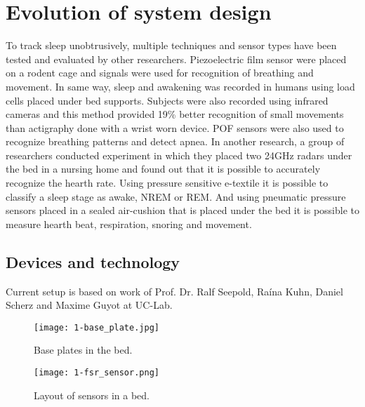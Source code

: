 \chapter{Evolution of system design}
\label{chap:evolution}

To track sleep unobtrusively, multiple techniques and sensor types have been tested and evaluated by other researchers. Piezoelectric film sensor were placed on a rodent cage and signals were used for recognition of breathing and movement\cite{piezo}. In same way, sleep and awakening was recorded in humans using load cells placed under bed supports\cite{load_cells}. Subjects were also recorded using infrared cameras and this method provided 19\% better recognition of small movements than actigraphy done with a wrist worn device\cite{video}. \ac{POF} sensors were also used to recognize breathing patterns and detect apnea\cite{optical}. In another research, a group of researchers conducted experiment in which they placed two 24\ac{GHz} radars under the bed in a nursing home and found out that it is possible to accurately recognize the hearth rate\cite{radar}. Using pressure sensitive e-textile it is possible to classify a sleep stage as awake, \ac{NREM} or \ac{REM}\cite{e-textile}. And using pneumatic pressure sensors placed in a sealed air-cushion that is placed under the bed it is possible to measure hearth beat, respiration, snoring and movement\cite{pneumatic}.

\section{Devices and technology}

Current setup is based on work of Prof. Dr. Ralf Seepold, Ra\'ina Kuhn, Daniel Scherz and Maxime Guyot at \ac{UC-Lab}\cite{Kuhn}\cite{Guyot}. 

\begin{figure}[h]
  \begin{center}
    \texttt{[image: 1-base\_plate.jpg]}
  \end{center}
  \caption{Base plates in the bed.}
  \label{fig:base-plate}
\end{figure}

\begin{figure}[h]
  \begin{center}
    \texttt{[image: 1-fsr\_sensor.png]}
  \end{center}
  \caption{Layout of sensors in a bed.}
  \label{fig:fsr-sensor}
\end{figure}


